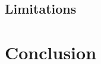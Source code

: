 \documentclass[main]{subfiles}
\begin{document}
\subsection{Limitations}

\section{Conclusion}
\end{document}
